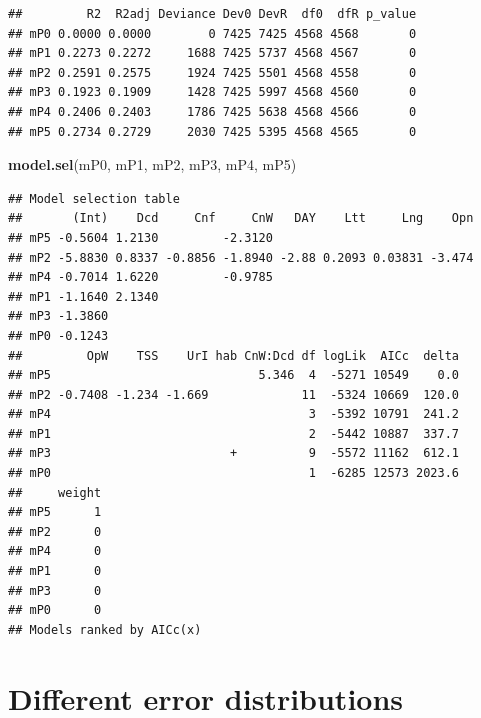\documentclass[12pt,]{book}
\newenvironment{Shaded}{\begin{snugshade}}{\end{snugshade}}
\newcommand{\KeywordTok}[1]{\textcolor[rgb]{0.13,0.29,0.53}{\textbf{#1}}}
\newcommand{\NormalTok}[1]{#1}
\begin{document}
\begin{verbatim}
##         R2  R2adj Deviance Dev0 DevR  df0  dfR p_value
## mP0 0.0000 0.0000        0 7425 7425 4568 4568       0
## mP1 0.2273 0.2272     1688 7425 5737 4568 4567       0
## mP2 0.2591 0.2575     1924 7425 5501 4568 4558       0
## mP3 0.1923 0.1909     1428 7425 5997 4568 4560       0
## mP4 0.2406 0.2403     1786 7425 5638 4568 4566       0
## mP5 0.2734 0.2729     2030 7425 5395 4568 4565       0
\end{verbatim}

\begin{Shaded}
\begin{Highlighting}[]
\KeywordTok{model.sel}\NormalTok{(mP0, mP1, mP2, mP3, mP4, mP5)}
\end{Highlighting}
\end{Shaded}

\begin{verbatim}
## Model selection table 
##       (Int)    Dcd     Cnf     CnW   DAY    Ltt     Lng    Opn
## mP5 -0.5604 1.2130         -2.3120                            
## mP2 -5.8830 0.8337 -0.8856 -1.8940 -2.88 0.2093 0.03831 -3.474
## mP4 -0.7014 1.6220         -0.9785                            
## mP1 -1.1640 2.1340                                            
## mP3 -1.3860                                                   
## mP0 -0.1243                                                   
##         OpW    TSS    UrI hab CnW:Dcd df logLik  AICc  delta
## mP5                             5.346  4  -5271 10549    0.0
## mP2 -0.7408 -1.234 -1.669             11  -5324 10669  120.0
## mP4                                    3  -5392 10791  241.2
## mP1                                    2  -5442 10887  337.7
## mP3                         +          9  -5572 11162  612.1
## mP0                                    1  -6285 12573 2023.6
##     weight
## mP5      1
## mP2      0
## mP4      0
## mP1      0
## mP3      0
## mP0      0
## Models ranked by AICc(x)
\end{verbatim}

\hypertarget{different-error-distributions}{%
\section{Different error distributions}\label{different-error-distributions}}
\end{document}
